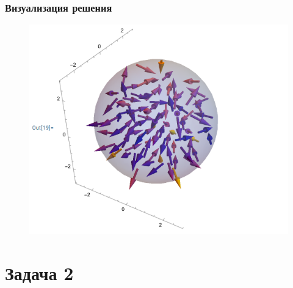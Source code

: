 \documentclass[11pt]{article}
\begin{document}
 \subsubsection*{Визуализация решения}
\begin{figure}
    \centering
    \includegraphics[width=0.75\linewidth]{image1.png}
\end{figure}
\newpage
\section*{Задача 2}
\end{document}
